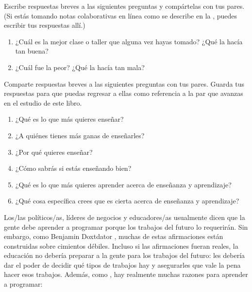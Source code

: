 
Escribe respuestas breves a las siguientes preguntas y compártelas con tus pares.
(Si estás tomando notas colaborativas en línea como se describe en la , puedes escribir tus respuestas allí.)

\begin{enumerate}

\item
 ¿Cuál es la mejor clase o taller que alguna vez hayas tomado?
 ¿Qué la hacía tan buena?

\item
 ¿Cuál fue la peor? 
 ¿Qué la hacía tan mala?

\end{enumerate}


Comparte respuestas breves a las siguientes preguntas con tus pares.
Guarda tus respuestas para que puedas regresar a ellas como referencia
a la par que avanzas en el estudio de este libro. 

\begin{enumerate}

\item
 ¿Qué es lo que más quieres enseñar?

\item
 ¿A quiénes tienes más ganas de enseñarles?

\item
 ¿Por qué quieres enseñar?

\item
 ¿Cómo sabrás si estás enseñando bien?

\item
 ¿Qué es lo que más quieres aprender acerca de enseñanza y aprendizaje? 

\item
 ¿Qué cosa específica crees que es cierta acerca de enseñanza y aprendizaje?

\end{enumerate}


Los/las políticos/as, líderes de negocios y educadores/as usualmente dicen que
la gente debe aprender a programar porque los trabajos del futuro lo requerirán.
Sin embargo,
como Benjamin Doxtdator
,
muchas de estas afirmaciones están construidas sobre cimientos débiles.
Incluso si las afirmaciones fueran reales, la educación no debería preparar a la gente para los trabajos del futuro:
les debería dar el poder de decidir qué tipos de trabajos hay y asegurarles que vale la pena hacer esos trabajos.
Además, como ,
hay realmente muchas razones para aprender a programar:

